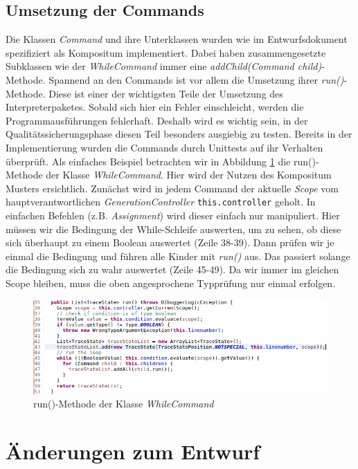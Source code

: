 \documentclass[parskip=full]{scrartcl}
\begin{document}
\subsection{Umsetzung der Commands}
Die Klassen \textit{Command} und ihre Unterklassen wurden wie im Entwurfsdokument spezifiziert als Kompositum implementiert. Dabei haben zusammengesetzte Subklassen wie der \textit{WhileCommand} immer eine \textit{addChild(Command child)}-Methode. Spannend an den Commands ist vor allem die Umsetzung ihrer \textit{run()}-Methode. Diese ist einer der wichtigsten Teile der Umsetzung des Interpreterpaketes. Sobald sich hier ein Fehler einschleicht, werden die Programmausführungen fehlerhaft. Deshalb wird es wichtig sein, in der Qualitätssicherungsphase diesen Teil besonders ausgiebig zu testen. Bereits in der Implementierung wurden die Commands durch Unittests auf ihr Verhalten überprüft. 
Als einfaches Beispiel betrachten wir in Abbildung \ref{runWhile} die run()-Methode der Klasse \textit{WhileCommand}. Hier wird der Nutzen des Kompositum Musters ersichtlich.
Zunächst wird in jedem Command der aktuelle \textit{Scope} vom hauptverantwortlichen \textit{GenerationController} \texttt{this.controller} geholt. In einfachen Befehlen (z.B. \textit{Assignment}) wird dieser einfach nur manipuliert. Hier müssen wir die Bedingung der While-Schleife auswerten, um zu sehen, ob diese sich überhaupt zu einem Boolean auswertet (Zeile 38-39). Dann prüfen wir je einmal die Bedingung und führen alle Kinder mit \textit{run()} aus. Das passiert solange die Bedingung sich zu wahr auswertet (Zeile 45-49). Da wir immer im gleichen Scope bleiben, muss die oben angesprochene Typprüfung nur einmal erfolgen.
\begin{figure}[!h]
\includegraphics[width=1.0\textwidth]{document_data/runWhile.png}
\caption{run()-Methode der Klasse \textit{WhileCommand}}
\label{runWhile}
\end{figure}
\section{Änderungen zum Entwurf}
\end{document}
